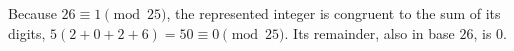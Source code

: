 Because $26\equiv1\pmod{25}$, the represented integer is congruent to the sum of its digits, $5(2+0+2+6)=50\equiv0\pmod{25}$. Its remainder, also in base $26$, is $\boxed0$.
